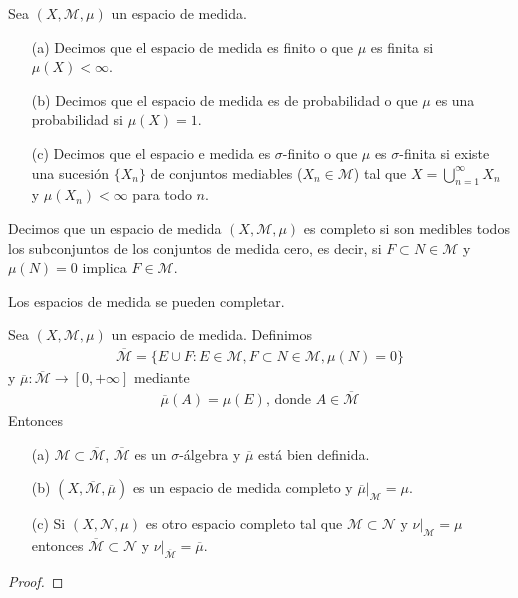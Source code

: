 \begin{defi}
    Sea $(X, \mathcal{M}, \mu)$ un espacio de medida.
    \begin{enumerate}
        \item[(a)] Decimos que el espacio de medida es finito o que $\mu$ es finita si $\mu(X) < \infty$.
        \item[(b)] Decimos que el espacio de medida es de probabilidad o que $\mu$ es una probabilidad si $\mu(X) = 1$.
        \item[(c)] Decimos que el espacio e medida es $\sigma$-finito o que $\mu$ es $\sigma$-finita si existe una sucesión $\{ X_n \}$ de conjuntos mediables ($X_n \in \mathcal{M}$) tal que  $X = \bigcup_{n=1}^{\infty}{X_n}$ y $\mu(X_n) < \infty$ para todo $n$.
    \end{enumerate}
\end{defi}
\begin{defi}
    Decimos que un espacio de medida $(X, \mathcal{M}, \mu)$ es completo si son medibles todos los subconjuntos de los conjuntos de medida cero, es decir, si $F \subset N \in \mathcal{M}$ y $\mu(N) = 0$ implica $F \in \mathcal{M}$.
\end{defi}
Los espacios de medida se pueden completar.
\begin{teo}
    \label{teo:completar}
    Sea $(X, \mathcal{M}, \mu)$ un espacio de medida. Definimos
    \begin{align*}
        \overline{\mathcal{M}} = \{ E \cup F : E \in \mathcal{M}, F \subset N \in \mathcal{M}, \mu(N) = 0\}
    \end{align*}
    y $\overline{\mu}: \overline{\mathcal{M}} \longrightarrow [0, +\infty]$ mediante
    \begin{align*}
        \overline{\mu}(A) = \mu(E) \text{, donde } A \in \overline{\mathcal{M}}
    \end{align*}
    Entonces
    \begin{enumerate}
        \item[(a)] $\mathcal{M} \subset \overline{\mathcal{M}}$, $\overline{\mathcal{M}}$ es un $\sigma$-álgebra y $\overline{\mu}$ está bien definida.
        \item[(b)] $(X, \mathcal{\overline{M}}, \overline{\mu})$ es un espacio de medida completo y $\overline{\mu}|_{\mathcal{M}} = \mu$.
        \item[(c)] Si $(X, \mathcal{N}, \mu)$ es otro espacio completo tal que $\mathcal{M} \subset \mathcal{N}$ y $\nu |_{\mathcal{M}} = \mu$ entonces $\overline{\mathcal{M}} \subset \mathcal{N}$ y $\nu |_{\overline{\mathcal{M}}} = \overline{\mu}$.
    \end{enumerate}
\end{teo}
\begin{proof}

\end{proof}


